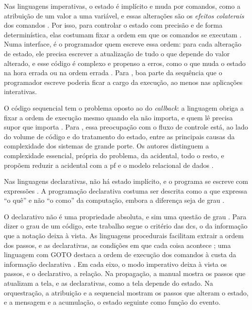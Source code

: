 Nas linguagens imperativas, o estado é implícito e muda por comandos,
como a atribuição de um valor a uma variável, e essas alterações são os
\emph{efeitos colaterais} dos comandos \cite[p. 361]{hudak1989}.
Por isso, para controlar o estado com precisão e de forma determinística,
elas costumam fixar a ordem em que os comandos se executam
\cite[p. 361]{hudak1989}.
Numa interface, é o programador quem escreve essa ordem: para cada alteração
de estado, ele precisa escrever a atualização de tudo o que depende do
valor alterado, e esse código é complexo e propenso a erros, como o que
muda o estado na hora errada ou na ordem errada
\cite[p. 52:2]{bainomugisha2013}.
Para \textcite[p. 929]{edwards2009}, boa parte da sequência que o
programador escreve poderia ficar a cargo da execução, ao menos nas
aplicações interativas.

O código sequencial tem o problema oposto ao do \emph{callback}: a linguagem
obriga a fixar a ordem de execução mesmo quando ela não importa, e quem lê
precisa supor que importa \cite[p. 8-9]{moseley2006}.
Para \textcite[p. 1]{moseley2006}, essa preocupação com o fluxo de controle
está, ao lado do volume de código e do tratamento do estado, entre as
principais causas da complexidade dos sistemas de grande porte.
Os autores distinguem a complexidade essencial, própria do problema, da
acidental, todo o resto, e propõem reduzir a acidental com a \gls{pf} e
o modelo relacional de dados \cite[p. 1 e 21]{moseley2006}.

Nas linguagens declarativas, não há estado implícito, e o programa se
escreve com expressões \cite[p. 361]{hudak1989}.
A programação declarativa costuma ser descrita como a que expressa “o
quê” e não “o como” da computação, embora a diferença seja de grau
\cite[p. 361]{hudak1989}.

O declarativo não é uma propriedade absoluta, e sim uma questão de grau
\cite[p. 406]{vanroy2004}.
Para dizer o grau de um código, este trabalho segue o critério das
\glspl{dc}, o da informação que a notação deixa à vista.
As linguagens procedurais facilitam extrair a ordem dos passos, e as
declarativas, as condições em que cada coisa acontece
\cite[p. 3]{green1989}; uma linguagem com GOTO destaca a ordem de
execução dos comandos à custa da informação declarativa
\cite[p. 136]{green1996d}.
Em cada eixo, o modo imperativo deixa à vista os passos, e o declarativo,
a relação.
Na propagação, a manual mostra os passos que atualizam a tela, e as
declarativas, como a tela depende do estado.
Na orquestração, a atribuição e a sequencial mostram os passos que alteram o estado, e a
mensagem e a acumulação, o estado seguinte como função do evento.

